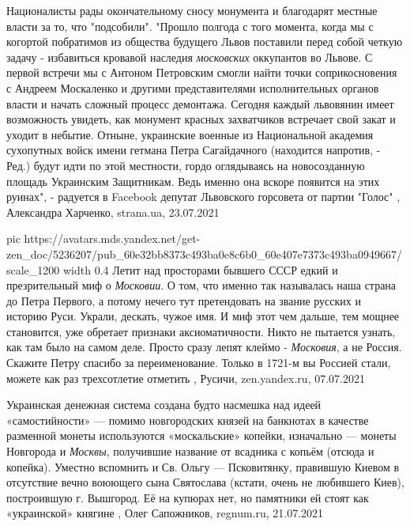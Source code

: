 Националисты рады окончательному сносу монумента и благодарят местные власти за
то, что "подсобили".  "Прошло полгода с того момента, когда мы с когортой
побратимов из общества будущего Львов поставили перед собой четкую задачу -
избавиться кровавой наследия \emph{московских} оккупантов во Львове. С первой встречи
мы с Антоном Петровским смогли найти точки соприкосновения с Андреем Москаленко
и другими представителями исполнительных органов власти и начать сложный
процесс демонтажа. Сегодня каждый львовянин имеет возможность увидеть, как
монумент красных захватчиков встречает свой закат и уходит в небытие. Отныне,
украинские военные из Национальной академия сухопутных войск имени гетмана
Петра Сагайдачного (находится напротив, - Ред.) будут идти по этой местности,
гордо оглядываясь на новосозданную площадь Украинским Защитникам. Ведь именно
она вскоре появится на этих руинах", - радуется в Facebook депутат Львовского
горсовета от партии "Голос"
, 
Александра Харченко, strana.ua, 23.07.2021

\ifcmt
  pic https://avatars.mds.yandex.net/get-zen_doc/5236207/pub_60e32bb8373c493ba0e8c6b0_60e407e7373c493ba0949667/scale_1200
  width 0.4
\fi
Летит над просторами бывшего СССР едкий и презрительный миф о \emph{Московии}. О том,
что именно так называлась наша страна до Петра Первого, а потому нечего тут
претендовать на звание русских и историю Руси. Украли, дескать, чужое имя.
И миф этот чем дальше, тем мощнее становится, уже обретает признаки
аксиоматичности. Никто не пытается узнать, как там было на самом деле. Просто
сразу лепят клеймо - \emph{Московия}, а не Россия. Скажите Петру спасибо за
переименование. Только в 1721-м вы Россией стали, можете как раз трехсотлетие
отметить
, 
Русичи, zen.yandex.ru, 07.07.2021

Украинская денежная система создана будто насмешка над идеей «самостийности» —
помимо новгородских князей на банкнотах в качестве разменной монеты
используются «москальские» копейки, изначально — монеты Новгорода и \emph{Москвы},
получившие название от всадника с копьём (отсюда и копейка).  Уместно вспомнить
и Св. Ольгу — Псковитянку, правившую Киевом в отсутствие вечно воюющего сына
Святослава (кстати, очень не любившего Киев), построившую г. Вышгород. Её на
купюрах нет, но памятники ей стоят как «украинской» княгине
, 
Олег Сапожников, regnum.ru, 21.07.2021

